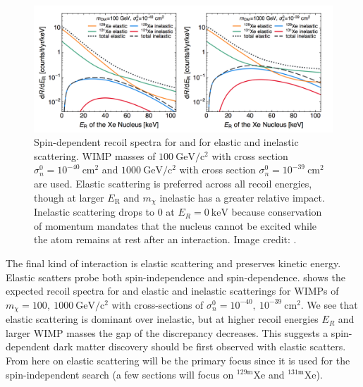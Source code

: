 \begin{figure}
\includegraphics[width=\textwidth]{ElasticInelasticRates}
\caption[Spin-dependent recoil spectra for  and  for elastic and inelastic scattering of $100$ and
$1000\ \mathrm{GeV/c^2}$ WIMPs.  The WIMPs have $\sigma_{n}^{0} = 10^{-40}$ and $10^{-39}\ \mathrm{cm^2}$, respectively.]{Spin-dependent
recoil spectra for  and  for elastic and inelastic scattering.  WIMP masses
of $100\ \mathrm{GeV/c^2}$ with cross section $\sigma_{n}^{0} = 10^{-40}\ \mathrm{cm^{2}}$
and $1000\ \mathrm{GeV/c^2}$ with cross section $\sigma_{n}^{0} = 10^{-39}\ \mathrm{cm^{2}}$ are used.  Elastic scattering
is preferred across all recoil energies, though at larger $E_{\mathrm{R}}$ and $m_{\chi}$ inelastic has a greater relative
impact.  Inelastic scattering drops to 0 at 
$E_{R} = 0\ \mathrm{keV}$ because conservation of momentum mandates that the nucleus cannot be excited while the atom remains at rest
after an interaction.  Image credit: .}
\label{fig:nr_elastic_inelastic}
\end{figure}

The final kind of interaction is elastic scattering and preserves kinetic energy.  Elastic scatters probe both spin-independence
and spin-dependence.   shows the expected recoil spectra for  and
 elastic and
inelastic scatterings for WIMPs of $m_{\chi} = 100,\ 1000\ \mathrm{GeV/c^2}$ with cross-sections of
$\sigma_{n}^{0} = 10^{-40},\ 10^{-39}\ \mathrm{cm^{2}}$.  We see that elastic scattering is dominant over inelastic, but at higher recoil
energies $E_{R}$ and larger WIMP masses the gap of the discrepancy decreases.  This suggests a spin-dependent dark matter discovery should
be first observed with elastic scatters.  From here on elastic scattering will be the primary focus since it is used for the
spin-independent search (a few sections will focus on $\mathrm{^{129m}Xe}$ and $\mathrm{^{131m}Xe}$).


